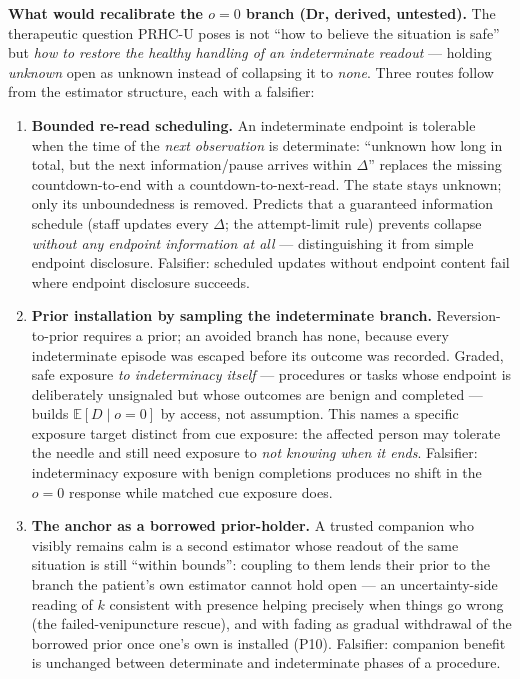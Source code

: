 \documentclass[9pt,twocolumn]{article}
\begin{document}
\textbf{What would recalibrate the $o=0$ branch (Dr, derived, untested).} The therapeutic question PRHC-U poses is not ``how to believe the situation is safe'' but \emph{how to restore the healthy handling of an indeterminate readout} --- holding \emph{unknown} open as unknown instead of collapsing it to \emph{none}. Three routes follow from the estimator structure, each with a falsifier:
\begin{enumerate}[leftmargin=1.6em]
\item \textbf{Bounded re-read scheduling.} An indeterminate endpoint is tolerable when the time of the \emph{next observation} is determinate: ``unknown how long in total, but the next information/pause arrives within $\Delta$'' replaces the missing countdown-to-end with a countdown-to-next-read. The state stays unknown; only its unboundedness is removed. Predicts that a guaranteed information schedule (staff updates every $\Delta$; the attempt-limit rule) prevents collapse \emph{without any endpoint information at all} --- distinguishing it from simple endpoint disclosure. Falsifier: scheduled updates without endpoint content fail where endpoint disclosure succeeds.
\item \textbf{Prior installation by sampling the indeterminate branch.} Reversion-to-prior requires a prior; an avoided branch has none, because every indeterminate episode was escaped before its outcome was recorded. Graded, safe exposure \emph{to indeterminacy itself} --- procedures or tasks whose endpoint is deliberately unsignaled but whose outcomes are benign and completed --- builds $\mathbb E[D\mid o=0]$ by access, not assumption. This names a specific exposure target distinct from cue exposure: the affected person may tolerate the needle and still need exposure to \emph{not knowing when it ends}. Falsifier: indeterminacy exposure with benign completions produces no shift in the $o=0$ response while matched cue exposure does.
\item \textbf{The anchor as a borrowed prior-holder.} A trusted companion who visibly remains calm is a second estimator whose readout of the same situation is still ``within bounds'': coupling to them lends their prior to the branch the patient's own estimator cannot hold open --- an uncertainty-side reading of $k$ consistent with presence helping precisely when things go wrong (the failed-venipuncture rescue), and with fading as gradual withdrawal of the borrowed prior once one's own is installed (P10). Falsifier: companion benefit is unchanged between determinate and indeterminate phases of a procedure.
\end{enumerate}
\end{document}
